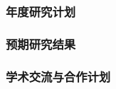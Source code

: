 \justifying
\NSFCBodyText

\subsubsection{年度研究计划}

\subsubsection{预期研究结果}

\subsubsection{学术交流与合作计划}
